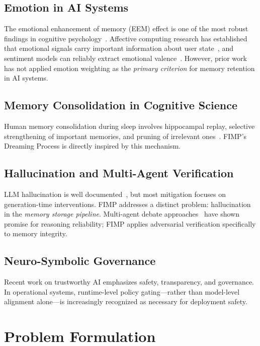 \documentclass[11pt,a4paper]{article}
\begin{document}
\subsection{Emotion in AI Systems}
The emotional enhancement of memory (EEM) effect is one of the most robust findings in cognitive psychology~\citep{labar2006cognitive}. Affective computing research has established that emotional signals carry important information about user state~\citep{picard1997affective}, and sentiment models can reliably extract emotional valence~\citep{devlin2019bert,liu2019roberta}. However, prior work has not applied emotion weighting as the \emph{primary criterion} for memory retention in AI systems.

\subsection{Memory Consolidation in Cognitive Science}
Human memory consolidation during sleep involves hippocampal replay, selective strengthening of important memories, and pruning of irrelevant ones~\citep{walker2004sleep,diekelmann2010memory}. FIMP's Dreaming Process is directly inspired by this mechanism.

\subsection{Hallucination and Multi-Agent Verification}
LLM hallucination is well documented~\citep{ji2023survey,huang2023survey}, but most mitigation focuses on generation-time interventions. FIMP addresses a distinct problem: hallucination in the \emph{memory storage pipeline}. Multi-agent debate approaches~\citep{du2023multiagent,liang2023divergent} have shown promise for reasoning reliability; FIMP applies adversarial verification specifically to memory integrity.

\subsection{Neuro-Symbolic Governance}
Recent work on trustworthy AI emphasizes safety, transparency, and governance. In operational systems, runtime-level policy gating---rather than model-level alignment alone---is increasingly recognized as necessary for deployment safety.

\section{Problem Formulation}
\end{document}
